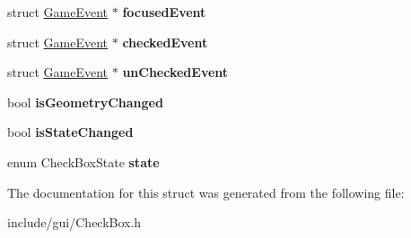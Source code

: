 \begin{DoxyCompactItemize}
\item 
\hypertarget{struct_check_box_af8909553495b609dc7c9efd469ffc31d}{}\label{struct_check_box_af8909553495b609dc7c9efd469ffc31d} 
struct \hyperlink{struct_game_event}{Game\+Event} $\ast$ {\bfseries focused\+Event}
\item 
\hypertarget{struct_check_box_addbf2597e636bf2937b48b86c2fc02a4}{}\label{struct_check_box_addbf2597e636bf2937b48b86c2fc02a4} 
struct \hyperlink{struct_game_event}{Game\+Event} $\ast$ {\bfseries checked\+Event}
\item 
\hypertarget{struct_check_box_aee6e54d35d8850022093412d674007da}{}\label{struct_check_box_aee6e54d35d8850022093412d674007da} 
struct \hyperlink{struct_game_event}{Game\+Event} $\ast$ {\bfseries un\+Checked\+Event}
\item 
\hypertarget{struct_check_box_a8ea7e8ac3e3330830aa7a4309390f3ac}{}\label{struct_check_box_a8ea7e8ac3e3330830aa7a4309390f3ac} 
bool {\bfseries is\+Geometry\+Changed}
\item 
\hypertarget{struct_check_box_abbe46dfeadc7ca8af4ccd6a1e60fa560}{}\label{struct_check_box_abbe46dfeadc7ca8af4ccd6a1e60fa560} 
bool {\bfseries is\+State\+Changed}
\item 
\hypertarget{struct_check_box_a4838c2cc38726ce534b297b6df5ec9fe}{}\label{struct_check_box_a4838c2cc38726ce534b297b6df5ec9fe} 
enum Check\+Box\+State {\bfseries state}
\end{DoxyCompactItemize}


The documentation for this struct was generated from the following file\+:\begin{DoxyCompactItemize}
\item 
include/gui/Check\+Box.\+h\end{DoxyCompactItemize}
